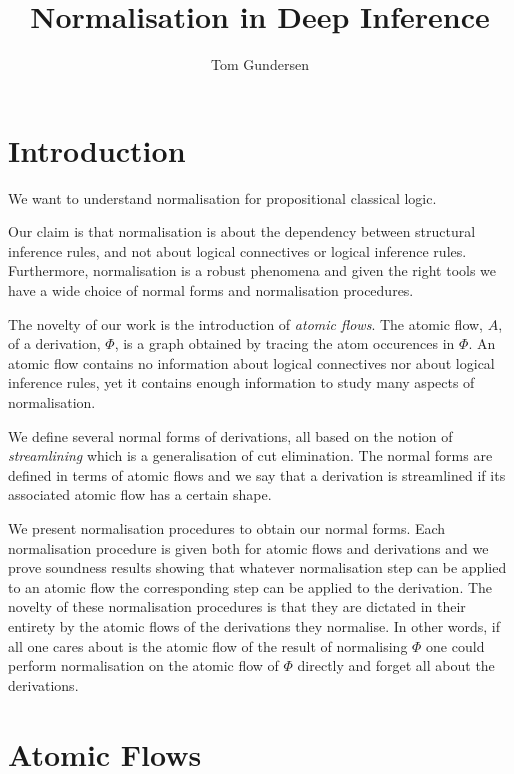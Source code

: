 \documentclass[12pt]{article}
\begin{document}
\title{Normalisation in Deep Inference}
\author{Tom Gundersen}

\maketitle

\section{Introduction}

We want to understand normalisation for propositional classical logic.

Our claim is that normalisation is about the dependency between structural inference rules, and not about logical connectives or logical inference rules. Furthermore, normalisation is a robust phenomena and given the right tools we have a wide choice of normal forms and normalisation procedures.

The novelty of our work is the introduction of \emph{atomic flows}. The atomic flow, $A$, of a derivation, $\Phi$, is a graph obtained by tracing the atom occurences in $\Phi$. An atomic flow contains no information about logical connectives nor about logical inference rules, yet it contains enough information to study many aspects of normalisation.

We define several normal forms of derivations, all based on the notion of \emph{streamlining} which is a generalisation of cut elimination. The normal forms are defined in terms of atomic flows and we say that a derivation is streamlined if its associated atomic flow has a certain shape.

We present normalisation procedures to obtain our normal forms. Each normalisation procedure is given both for atomic flows and derivations and we prove soundness results showing that whatever normalisation step can be applied to an atomic flow the corresponding step can be applied to the derivation. The novelty of these normalisation procedures is that they are dictated in their entirety by the atomic flows of the derivations they normalise. In other words, if all one cares about is the atomic flow of the result of normalising $\Phi$ one could perform normalisation on the atomic flow of $\Phi$ directly and forget all about the derivations.

\section{Atomic Flows}
\end{document}

